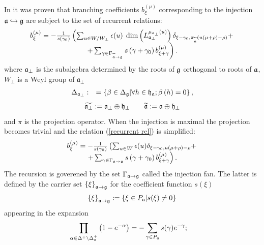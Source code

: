 \documentclass[12pt]{article}
\begin{document}
In \cite{2010arXiv1007.0318L} it was proven that branching coefficients $%
b_{\xi }^{\left( \mu \right) }$ corresponding to the injection $\frak{a}%
\hookrightarrow \frak{g}$ are subject to the set of recurrent relations:
\begin{equation}
\begin{array}{c}
b_{\xi }^{\left( \mu \right) }=-\frac{1}{s\left( \gamma _{0}\right) }\left(
\sum_{u\in W/W_{\perp}}\epsilon (u)\;\dim \left( L_{\frak{a}_{\perp }}^{\mu _{\frak{a}%
_{\perp }}\left( u\right) }\right) \delta _{\xi -\gamma _{0},\pi _{%
\widetilde{\frak{a}}}(u(\mu +\rho )-\rho )}+\right. \\
\left. +\sum_{\gamma \in \Gamma _{\widetilde{\frak{a}}\rightarrow \frak{g}%
}}s\left( \gamma +\gamma _{0}\right) b_{\xi +\gamma }^{\left( \mu \right)
}\right) .
\end{array}
\label{recurrent rel}
\end{equation}
where $\frak{a}_{\perp }$ is the subalgebra determined by the roots of $%
\frak{g}$ orthogonal to roots of $\frak{a}$, $W_{\perp}$ is a Weyl group of $\mathfrak{a}_{\perp}$
\begin{eqnarray}
\Delta _{\frak{a}_{\perp }} &:&=\left\{ \beta \in \Delta _{\frak{g}}|\forall
h\in \frak{h}_{\frak{a}};\beta \left( h\right) =0\right\} ,
\label{delta a ort}
\end{eqnarray}
\begin{eqnarray}
\widetilde{\frak{a}_{\perp }} :=\frak{a}_{\perp }\oplus \frak{h}_{\perp }
\qquad \widetilde{\frak{a}} :=\frak{a}\oplus \frak{h}_{\perp }
\end{eqnarray}
and $\pi$ is the projection operator. When the injection is maximal the
projection becomes trivial and the relation (\ref{recurrent rel}) is
simplified:
\begin{equation}
\begin{array}{c}
b_{\xi }^{\left( \mu \right) }=-\frac{1}{s\left( \gamma _{0}\right) }\left(
\sum_{u\in W}\epsilon (u) \delta _{\xi -\gamma _{0}, u(\mu +\rho )-\rho
}+\right. \\
\left. +\sum_{\gamma \in \Gamma _{\frak{a}\rightarrow \frak{g}}}s\left(
\gamma +\gamma _{0}\right) b_{\xi +\gamma }^{\left( \mu \right) }\right) .
\end{array}
\label{recurrent relation max}
\end{equation}
The recursion is goverened by the set $\Gamma _{\frak{a}\rightarrow \frak{g}}
$ called the injection fan. The latter is defined by the carrier set $%
\left\{ \xi \right\} _{\frak{a}\rightarrow \frak{g}}$ for the coefficient
function $s(\xi )$
\[
\left\{ \xi \right\} _{\frak{a}\rightarrow \frak{g}}:=\left\{ \xi \in P_{%
\frak{a}}|s(\xi )\neq 0\right\}
\]
appearing in the expansion
\begin{equation}
\prod_{\alpha \in \Delta ^{+}\setminus \Delta _{\frak{a}}^{+}}\left( 1-e^{
-\alpha }\right) =-\sum_{\gamma \in P_{\frak{a}}}s(\gamma )e^{-\gamma };\quad
\label{product}
\end{equation}
\end{document}
